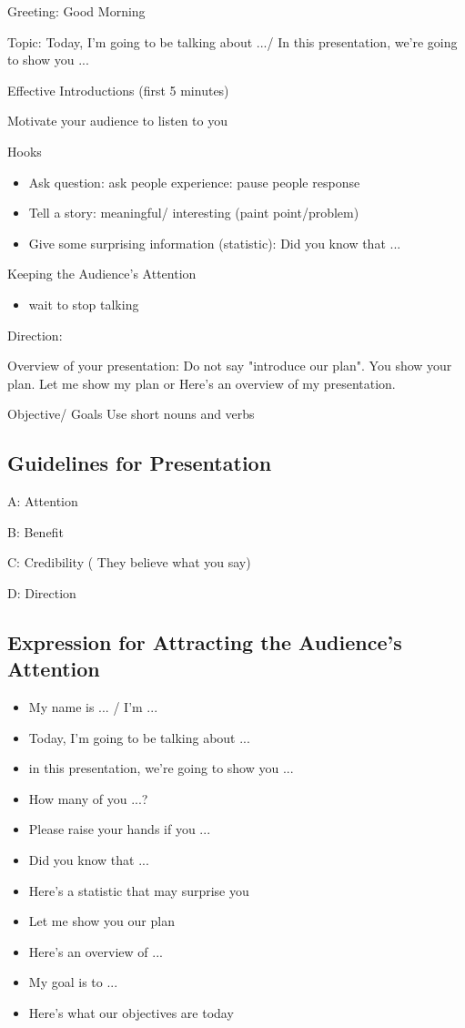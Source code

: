 \documentclass{article}
\begin{document}
Greeting: Good Morning

Topic: Today, I'm going to be talking about .../ In this presentation, we're going to show you ...

Effective Introductions (first 5 minutes) 

Motivate your audience to listen to you

Hooks
\begin{itemize}
\item{Ask question: ask people experience: pause people response }
\item{Tell a story: meaningful/ interesting (paint point/problem)}
\item{Give some surprising information (statistic): Did you know that ...}
\end{itemize}

Keeping the Audience's Attention
\begin{itemize}
\item{wait to stop talking}

\end{itemize}

Direction:

Overview of your presentation: Do not say "introduce our plan". You show your plan. Let me show my plan or Here's an overview of my presentation. 

Objective/ Goals
Use short nouns and verbs

\subsection{Guidelines for Presentation}
A: Attention

B: Benefit

C: Credibility ( They believe what you say)

D: Direction

\subsection{Expression for Attracting the Audience's Attention}

\begin{itemize}
\item{My name is ... / I'm ...}
\item{Today, I'm going to be talking about ...}
\item{in this presentation, we're going to show you ...}
\item{How many of you ...?}
\item{Please raise your hands if you ...}
\item{Did you know that ...}
\item{Here's a statistic that may surprise you}
\item{Let me show you our plan}
\item{Here's an overview of ...}
\item{My goal is to ...}
\item{Here's what our objectives are today}
\end{itemize}
\end{document}

